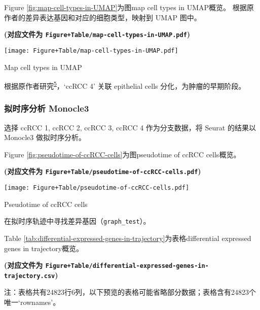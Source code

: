 \documentclass[
]{article}
\begin{document}
Figure \ref{fig:map-cell-types-in-UMAP}为图map cell types in UMAP概览。
根据原作者的差异表达基因和对应的细胞类型，映射到 UMAP 图中。

\textbf{(对应文件为 \texttt{Figure+Table/map-cell-types-in-UMAP.pdf})}

\def\@captype{figure}
\begin{center}
\texttt{[image: Figure+Table/map-cell-types-in-UMAP.pdf]}
\caption{Map cell types in UMAP}\label{fig:map-cell-types-in-UMAP}
\end{center}

根据原作者研究\textsuperscript{\protect\hyperlink{ref-IntegrativeSinYuZh2023}{5}}，`ccRCC 4' 关联 epithelial cells 分化，为肿瘤的早期阶段。

\hypertarget{ux62dfux65f6ux5e8fux5206ux6790-monocle3}{%
\subsubsection{拟时序分析 Monocle3}\label{ux62dfux65f6ux5e8fux5206ux6790-monocle3}}

选择 ccRCC 1, ccRCC 2, ccRCC 3, ccRCC 4 作为分支数据，将 Seurat 的结果以 Monocle3 做拟时序分析。

Figure \ref{fig:pseudotime-of-ccRCC-cells}为图pseudotime of ccRCC cells概览。

\textbf{(对应文件为 \texttt{Figure+Table/pseudotime-of-ccRCC-cells.pdf})}

\def\@captype{figure}
\begin{center}
\texttt{[image: Figure+Table/pseudotime-of-ccRCC-cells.pdf]}
\caption{Pseudotime of ccRCC cells}\label{fig:pseudotime-of-ccRCC-cells}
\end{center}

在拟时序轨迹中寻找差异基因（\texttt{graph\_test}）。

Table \ref{tab:differential-expressed-genes-in-trajectory}为表格differential expressed genes in trajectory概览。

\textbf{(对应文件为 \texttt{Figure+Table/differential-expressed-genes-in-trajectory.csv})}

\begin{center}\begin{tcolorbox}[colback=gray!10, colframe=gray!50, width=0.9\linewidth, arc=1mm, boxrule=0.5pt]注：表格共有24823行6列，以下预览的表格可能省略部分数据；表格含有24823个唯一`rownames'。
\end{tcolorbox}
\end{center}
\end{document}
